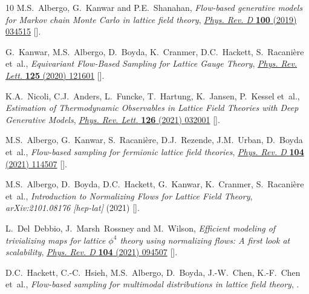 \begin{thebibliography}{10}
M.S.~Albergo, G.~Kanwar and P.E.~Shanahan, \emph{Flow-based generative models
  for {{Markov}} chain {{Monte Carlo}} in lattice field theory},
  \href{https://doi.org/10.1103/PhysRevD.100.034515}{\emph{Phys. Rev. D}
  {\bfseries 100} (2019) 034515}
  [\href{https://arxiv.org/abs/1904.12072}{{}}].

G.~Kanwar, M.S.~Albergo, D.~Boyda, K.~Cranmer, D.C.~Hackett, S.~Racani{\`e}re
  et~al., \emph{Equivariant {{Flow-Based Sampling}} for {{Lattice Gauge
  Theory}}}, \href{https://doi.org/10.1103/PhysRevLett.125.121601}{\emph{Phys.
  Rev. Lett.} {\bfseries 125} (2020) 121601}
  [\href{https://arxiv.org/abs/2003.06413}{{}}].

K.A.~Nicoli, C.J.~Anders, L.~Funcke, T.~Hartung, K.~Jansen, P.~Kessel et~al.,
  \emph{Estimation of {{Thermodynamic Observables}} in {{Lattice Field
  Theories}} with {{Deep Generative Models}}},
  \href{https://doi.org/10.1103/PhysRevLett.126.032001}{\emph{Phys. Rev. Lett.}
  {\bfseries 126} (2021) 032001}
  [\href{https://arxiv.org/abs/2007.07115}{{}}].

M.S.~Albergo, G.~Kanwar, S.~Racani{\`e}re, D.J.~Rezende, J.M.~Urban, D.~Boyda
  et~al., \emph{Flow-based sampling for fermionic lattice field theories},
  \href{https://doi.org/10.1103/PhysRevD.104.114507}{\emph{Phys. Rev. D}
  {\bfseries 104} (2021) 114507}
  [\href{https://arxiv.org/abs/2106.05934}{{}}].

M.S.~Albergo, D.~Boyda, D.C.~Hackett, G.~Kanwar, K.~Cranmer, S.~Racani{\`e}re
  et~al., \emph{Introduction to {{Normalizing Flows}} for {{Lattice Field
  Theory}}}, {\emph{arXiv:2101.08176 [hep-lat]} (2021) }
  [\href{https://arxiv.org/abs/2101.08176}{{}}].

L.~Del~Debbio, J.~Marsh~Rossney and M.~Wilson, \emph{Efficient modeling of
  trivializing maps for lattice $\phi^4$ theory using normalizing flows: {{A}}
  first look at scalability},
  \href{https://doi.org/10.1103/PhysRevD.104.094507}{\emph{Phys. Rev. D}
  {\bfseries 104} (2021) 094507}
  [\href{https://arxiv.org/abs/2105.12481}{{}}].

D.C.~Hackett, C.-C.~Hsieh, M.S.~Albergo, D.~Boyda, J.-W.~Chen, K.-F.~Chen
  et~al., \emph{{Flow-based sampling for multimodal distributions in lattice
  field theory}},  \href{https://arxiv.org/abs/2107.00734}{{}}.


\end{thebibliography}
